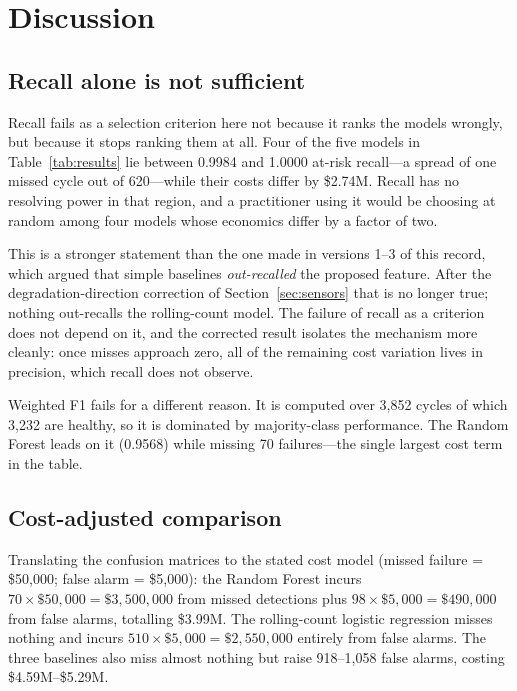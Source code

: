 \documentclass[10pt,twocolumn]{article}
\begin{document}
\section{Discussion}
\label{sec:discussion}

\subsection{Recall alone is not sufficient}
\label{sec:recallfails}

Recall fails as a selection criterion here not because it ranks the models wrongly,
but because it stops ranking them at all. Four of the five models in
Table~\ref{tab:results} lie between 0.9984 and 1.0000 at-risk recall---a spread of
one missed cycle out of 620---while their costs differ by \$2.74M. Recall has no
resolving power in that region, and a practitioner using it would be choosing at
random among four models whose economics differ by a factor of two.

This is a stronger statement than the one made in versions 1--3 of this record, which
argued that simple baselines \emph{out-recalled} the proposed feature. After the
degradation-direction correction of Section~\ref{sec:sensors} that is no longer true;
nothing out-recalls the rolling-count model. The failure of recall as a criterion does
not depend on it, and the corrected result isolates the mechanism more cleanly: once
misses approach zero, all of the remaining cost variation lives in precision, which
recall does not observe.

Weighted F1 fails for a different reason. It is computed over 3,852 cycles of which
3,232 are healthy, so it is dominated by majority-class performance. The Random Forest
leads on it (0.9568) while missing 70 failures---the single largest cost term in the
table.

\subsection{Cost-adjusted comparison}

Translating the confusion matrices to the stated cost model (missed failure =
\$50,000; false alarm = \$5,000): the Random Forest incurs
$70 \times \$50{,}000 = \$3{,}500{,}000$ from missed detections plus
$98 \times \$5{,}000 = \$490{,}000$ from false alarms, totalling \$3.99M. The rolling-count
logistic regression misses nothing and incurs $510 \times \$5{,}000 = \$2{,}550{,}000$
entirely from false alarms. The three baselines also miss almost nothing but raise
918--1,058 false alarms, costing \$4.59M--\$5.29M.
\end{document}
